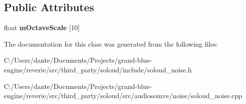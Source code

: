 \subsection*{Public Attributes}
\begin{DoxyCompactItemize}
\item 
\mbox{\label{class_so_loud_1_1_noise_a4765693fb9c30505d51724c1938076e2}} 
float {\bfseries m\+Octave\+Scale} \mbox{[}10\mbox{]}
\end{DoxyCompactItemize}


The documentation for this class was generated from the following files\+:\begin{DoxyCompactItemize}
\item 
C\+:/\+Users/dante/\+Documents/\+Projects/grand-\/blue-\/engine/reverie/src/third\+\_\+party/soloud/include/soloud\+\_\+noise.\+h\item 
C\+:/\+Users/dante/\+Documents/\+Projects/grand-\/blue-\/engine/reverie/src/third\+\_\+party/soloud/src/audiosource/noise/soloud\+\_\+noise.\+cpp\end{DoxyCompactItemize}
